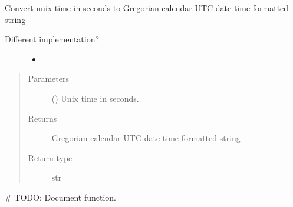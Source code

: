 \documentclass[letterpaper,10pt,english]{sphinxmanual}
\begin{document}
\begin{fulllineitems}
\label{\detokenize{modules/ccsds_write:ccsds_write.unix2datestrf}}
Convert unix time in seconds to Gregorian calendar UTC date-time formatted string

Different implementation?
\begin{description}
\item[{}] \leavevmode\begin{itemize}
\item {} 
{\hyperref[\detokenize{modules/ccsds_write:ccsds_write.unix2date}]{}}

\end{itemize}

\end{description}
\begin{quote}\begin{description}
\item[{Parameters}] \leavevmode
{} () \textendash{} Unix time in seconds.

\item[{Returns}] \leavevmode
Gregorian calendar UTC date-time formatted string

\item[{Return type}] \leavevmode
str

\end{description}\end{quote}

\end{fulllineitems}


\begin{fulllineitems}
\label{\detokenize{modules/ccsds_write:ccsds_write.write_ccsds}}
\# TODO: Document function.

\end{fulllineitems}
\end{document}
